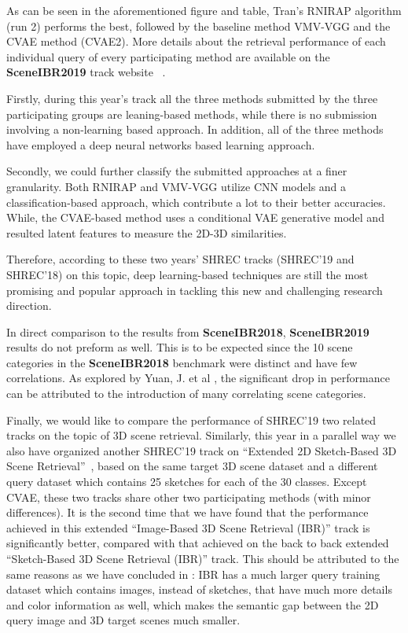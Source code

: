 \documentclass[../main.tex]{subfiles}
\begin{document}
As can be seen in the aforementioned figure and table, Tran's RNIRAP algorithm 
(run 2) performs the best, followed by the baseline method VMV-VGG and the CVAE 
method (CVAE2). More details about the retrieval performance of each individual 
query of every participating method are available on the \textbf{SceneIBR2019} 
track website~\cite{SceneIBR19} . 

Firstly, during this year's track all the three methods submitted by the three 
participating groups are leaning-based methods, while there is no submission 
involving a non-learning based approach. In addition, all of the three methods 
have employed a deep neural networks based learning approach. 

Secondly, we could further classify the submitted approaches at a finer granularity. Both RNIRAP and VMV-VGG utilize CNN models and a classification-based approach, which contribute a lot to their better accuracies. While, the CVAE-based method uses a conditional VAE generative model and resulted latent features to measure the 2D-3D similarities. 

Therefore, according to these two years' SHREC tracks (SHREC'19 and SHREC'18) on this topic, deep learning-based techniques are still the most promising and popular approach in tackling this new and challenging research direction.

In direct comparison to the results from \textbf{SceneIBR2018}, 
\textbf{SceneIBR2019} results do not preform as well. This is to be expected 
since the 10 scene categories in the \textbf{SceneIBR2018} benchmark were 
distinct and have few correlations. As explored by Yuan, J. et al \cite{MIPR}, 
the significant drop in performance can be attributed to the introduction of 
many correlating scene categories. 


Finally, we would like to compare the performance of SHREC'19 two related 
tracks on the topic of 3D scene retrieval. Similarly, this year in a parallel 
way we also have organized another SHREC'19 track on ``Extended 2D Sketch-Based 
3D Scene Retrieval''~\cite{SceneIBR19}, based on the same target 3D scene 
dataset and a different query dataset which contains 25 sketches for each of 
the 30 classes. Except CVAE, these two tracks share other two participating 
methods (with minor differences). It is the second time that we have found that 
the performance achieved in this extended ``Image-Based 3D Scene Retrieval 
(IBR)'' track is significantly better, compared with that achieved on the back 
to back extended ``Sketch-Based 3D Scene Retrieval (IBR)'' track. This should 
be attributed to the same reasons as we 
have concluded in \cite{SceneIBR18Journal}: IBR has a 
much larger query training dataset which contains images, instead of sketches, 
that have much more details and color information as well, which makes the 
semantic gap between the 2D query image and 3D target scenes much smaller.  
\end{document}

